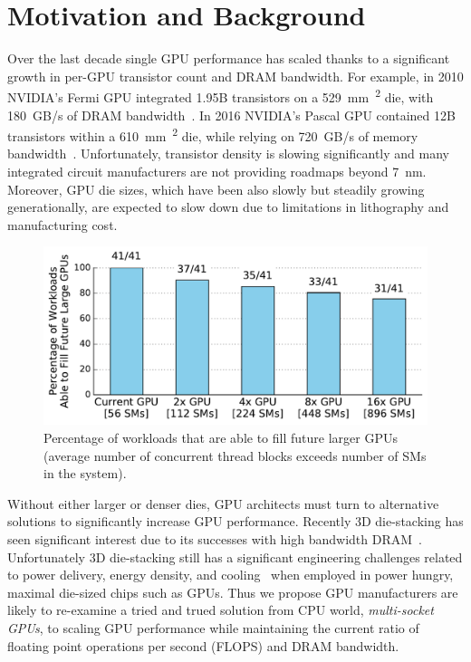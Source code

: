 \vspace{-0.1in}
\section{Motivation and Background}
\label{sec:background}

Over the last decade single GPU performance has scaled thanks to a 
significant growth in per-GPU transistor count and DRAM bandwidth. For 
example, in 2010 NVIDIA's Fermi GPU integrated 1.95B transistors on a 
\SI{529}{mm\textsuperscript{2}} die, with \SI{180}{GB/s} of DRAM 
bandwidth~\cite{hennessypatterson11}. In 2016 NVIDIA's Pascal GPU 
contained 12B transistors within a \SI{610}{mm\textsuperscript{2}} die, while 
relying on \SI{720}{GB/s} of memory bandwidth~\cite{inside-pascal}. Unfortunately, 
transistor density is slowing significantly and many integrated circuit 
manufacturers are not providing roadmaps beyond \SI{7}{nm}. Moreover, GPU die sizes,
which have been also slowly but steadily growing generationally, are 
expected to slow down due to limitations in lithography and manufacturing cost.

\begin{figure}[t] 
    \centering
    \includegraphics[width=1.0\columnwidth]{figures/plot_ctas_per_sm.pdf}
    \caption{Percentage of workloads that are able to fill future larger GPUs 
    (average number of concurrent thread blocks exceeds number of SMs in the system).}
    \label{fig:ctas}
    \vspace{-.2in}
\end{figure}

Without either larger or denser dies, GPU architects must turn to 
alternative solutions to significantly increase GPU performance.  Recently 3D 
die-stacking has seen significant interest due to its successes with high 
bandwidth DRAM~\cite{HBM}. Unfortunately 3D die-stacking still has 
a significant engineering challenges related to power delivery, 
energy density, and cooling~\cite{verbree2010cost} when employed in power 
hungry, maximal die-sized chips such as GPUs. Thus we propose GPU manufacturers 
are likely to re-examine a tried and trued solution from CPU world, 
\textit{multi-socket GPUs}, to scaling GPU performance while maintaining the 
current ratio of floating point operations per second (FLOPS) and DRAM 
bandwidth.

